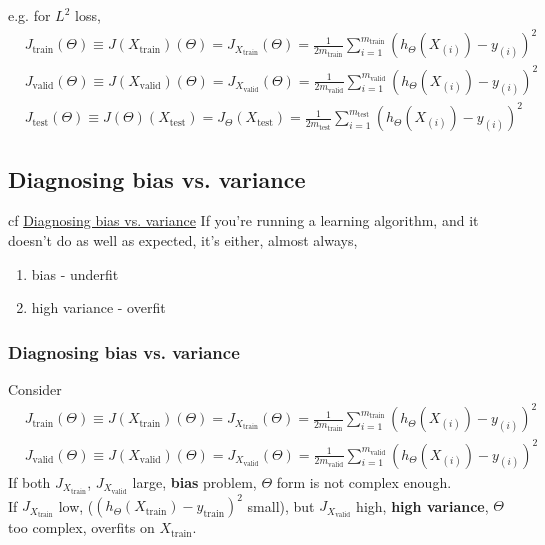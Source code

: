 \documentclass[10pt]{amsart}
\begin{document}
\begin{multicols*}{2}
e.g. for $L^2$ loss, 
\[
\begin{aligned}
	& J_{\text{train}}(\Theta) \equiv  J(X_{\text{train}})(\Theta) = J_{X_{\text{train}}}(\Theta) = \frac{1}{2m_{\text{train}}} \sum_{i=1}^{m_{\text{train}} } (h_{\Theta}(X_{(i)}) -y_{(i)} )^2 \\ 
	& J_{\text{valid}}(\Theta) \equiv  J(X_{\text{valid}})(\Theta) = J_{X_{\text{valid}}}(\Theta) = \frac{1}{2m_{\text{valid}}} \sum_{i=1}^{m_{\text{valid}} } (h_{\Theta}(X_{(i)}) -y_{(i)} )^2 \\
	& J_{\text{test}}(\Theta) \equiv  J(\Theta)(X_{\text{test}}) = J_{\Theta}(X_{\text{test}}) = \frac{1}{2m_{\text{test}}} \sum_{i=1}^{m_{\text{test}} } (h_{\Theta}(X_{(i)}) -y_{(i)} )^2 
\end{aligned}
\]

\subsection{Diagnosing bias vs. variance}

cf \href{https://www.coursera.org/learn/machine-learning/lecture/yCAup/diagnosing-bias-vs-variance}{Diagnosing bias vs. variance}  If you're running a learning algorithm, and it doesn't do as well as expected, it's either, almost always,
\begin{enumerate}
\item bias - underfit
\item high variance - overfit
\end{enumerate}

\subsubsection{Diagnosing bias vs. variance}

Consider 
\[
\begin{aligned}
	& J_{\text{train}}(\Theta) \equiv  J(X_{\text{train}})(\Theta) = J_{X_{\text{train}}}(\Theta) = \frac{1}{2m_{\text{train}}} \sum_{i=1}^{m_{\text{train}} } (h_{\Theta}(X_{(i)}) -y_{(i)} )^2 \\ 
	& J_{\text{valid}}(\Theta) \equiv  J(X_{\text{valid}})(\Theta) = J_{X_{\text{valid}}}(\Theta) = \frac{1}{2m_{\text{valid}}} \sum_{i=1}^{m_{\text{valid}} } (h_{\Theta}(X_{(i)}) -y_{(i)} )^2 
\end{aligned}
\]
If both $J_{X_{\text{train}}}$, $J_{X_{\text{valid}}}$ large, \textbf{bias} problem, $\Theta$ form is not complex enough.  \\
If $J_{X_{\text{train}}}$ low, ($(h_{\Theta}(X_{\text{train}}) -y_{\text{train}})^2$ small), but $J_{X_{\text{valid}}}$ high, \textbf{high variance}, $\Theta$ too complex, overfits on $X_{\text{train}}$.  


\end{multicols*}
\end{document}
